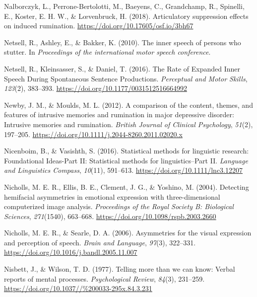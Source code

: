 \documentclass[a4paper,12pt,twoside,openright,oldfontcommands,final]{memoir}
\begin{document}
\leavevmode\hypertarget{ref-nalborczyk_articulatory_2018}{}%
Nalborczyk, L., Perrone-Bertolotti, M., Baeyens, C., Grandchamp, R., Spinelli, E., Koster, E. H. W., \& Lœvenbruck, H. (2018). Articulatory suppression effects on induced rumination. \url{https://doi.org/10.17605/osf.io/3bh67}

\leavevmode\hypertarget{ref-netsell_inner_2010}{}%
Netsell, R., Ashley, E., \& Bakker, K. (2010). The inner speech of persons who stutter. In \emph{Proceedings of the international motor speech conference}.

\leavevmode\hypertarget{ref-netsell_rate_2016}{}%
Netsell, R., Kleinsasser, S., \& Daniel, T. (2016). The Rate of Expanded Inner Speech During Spontaneous Sentence Productions. \emph{Perceptual and Motor Skills}, \emph{123}(2), 383--393. \url{https://doi.org/10.1177/0031512516664992}

\leavevmode\hypertarget{ref-newby_comparison_2012}{}%
Newby, J. M., \& Moulds, M. L. (2012). A comparison of the content, themes, and features of intrusive memories and rumination in major depressive disorder: Intrusive memories and rumination. \emph{British Journal of Clinical Psychology}, \emph{51}(2), 197--205. \url{https://doi.org/10.1111/j.2044-8260.2011.02020.x}

\leavevmode\hypertarget{ref-nicenboim_statistical_2016}{}%
Nicenboim, B., \& Vasishth, S. (2016). Statistical methods for linguistic research: Foundational Ideas-Part II: Statistical methods for linguistics--Part II. \emph{Language and Linguistics Compass}, \emph{10}(11), 591--613. \url{https://doi.org/10.1111/lnc3.12207}

\leavevmode\hypertarget{ref-nicholls_detecting_2004}{}%
Nicholls, M. E. R., Ellis, B. E., Clement, J. G., \& Yoshino, M. (2004). Detecting hemifacial asymmetries in emotional expression with three-dimensional computerized image analysis. \emph{Proceedings of the Royal Society B: Biological Sciences}, \emph{271}(1540), 663--668. \url{https://doi.org/10.1098/rspb.2003.2660}

\leavevmode\hypertarget{ref-nicholls_asymmetries_2006}{}%
Nicholls, M. E. R., \& Searle, D. A. (2006). Asymmetries for the visual expression and perception of speech. \emph{Brain and Language}, \emph{97}(3), 322--331. \url{https://doi.org/10.1016/j.bandl.2005.11.007}

\leavevmode\hypertarget{ref-nisbett_telling_1977}{}%
Nisbett, J., \& Wilson, T. D. (1977). Telling more than we can know: Verbal reports of mental processes. \emph{Psychological Review}, \emph{84}(3), 231--259. \url{https://doi.org/10.1037//\%200033-295x.84.3.231}
\end{document}
